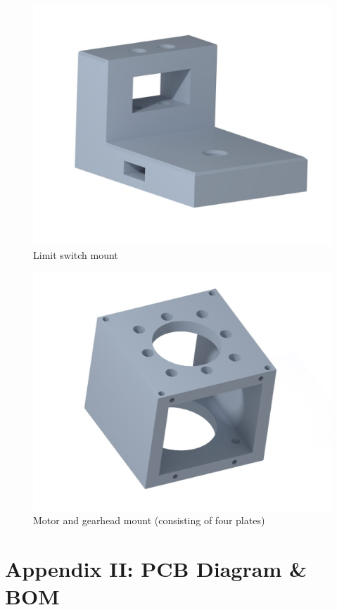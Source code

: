 \documentclass[12pt]{report}
\begin{document}
	\begin{figure}[h] 
		\centering
		\includegraphics[width=\linewidth]{ls_mount2}
		\caption{Limit switch mount}
		\label{fig:ls_mount}
	\end{figure}

	\begin{figure}[h] 
		\centering
		\includegraphics[width=0.9\linewidth]{motor_mount01}
		\caption{Motor and gearhead mount (consisting of four plates)}
		\label{fig:motor_mount}
	\end{figure}

\afterpage{\null\newpage}
\chapter*{Appendix II: PCB Diagram \& BOM} \label{ap:pcb}
\end{document}
